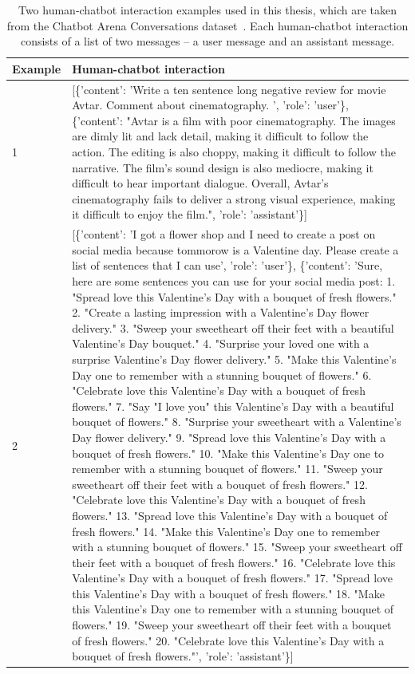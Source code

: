 \documentclass{DESSThesis}
\begin{document}
\begin{table}
	\centering
	\caption{Two human-chatbot interaction examples used in this thesis, which are taken from the Chatbot Arena Conversations dataset~\cite{zheng_judging_2023}. Each human-chatbot interaction consists of a list of two messages -- a user message and an assistant message.}
	\label{tab:examples-interactions}
	\begin{threeparttable}
		\renewcommand*{\arraystretch}{1.3}
		\setlength{\tabcolsep}{0.7em}
		\begin{tabularx}{\textwidth}{lX}
			\toprule
			Example &  Human-chatbot interaction \\
			\midrule
			1&[\{'content': 'Write a ten sentence long negative review for movie Avtar. Comment about cinematography. ',
				'role': 'user'\},
			\{'content': "Avtar is a film with poor cinematography. The images are dimly lit and lack detail, making it difficult to follow the action. The editing is also choppy, making it difficult to follow the narrative. The film's sound design is also mediocre, making it difficult to hear important dialogue. Overall, Avtar's cinematography fails to deliver a strong visual experience, making it difficult to enjoy the film.",
				'role': 'assistant'\}]\\
			2&[\{'content': 'I got a flower shop and I need to create a post on social media because tommorow is a Valentine day. Please create a list of sentences that I can use',
				'role': 'user'\},
			\{'content': 'Sure, here are some sentences you can use for your social media post: 1.   "Spread love this Valentine's Day with a bouquet of fresh flowers." 2.   "Create a lasting impression with a Valentine's Day flower delivery." 3.   "Sweep your sweetheart off their feet with a beautiful Valentine's Day bouquet." 4.   "Surprise your loved one with a surprise Valentine's Day flower delivery." 5.   "Make this Valentine's Day one to remember with a stunning bouquet of flowers." 6.   "Celebrate love this Valentine's Day with a bouquet of fresh flowers." 7.   "Say "I love you" this Valentine's Day with a beautiful bouquet of flowers." 8.   "Surprise your sweetheart with a Valentine's Day flower delivery." 9.   "Spread love this Valentine's Day with a bouquet of fresh flowers." 10.   "Make this Valentine's Day one to remember with a stunning bouquet of flowers." 11.   "Sweep your sweetheart off their feet with a bouquet of fresh flowers." 12.   "Celebrate love this Valentine's Day with a bouquet of fresh flowers." 13.   "Spread love this Valentine's Day with a bouquet of fresh flowers." 14.   "Make this Valentine's Day one to remember with a stunning bouquet of flowers." 15.   "Sweep your sweetheart off their feet with a bouquet of fresh flowers." 16.   "Celebrate love this Valentine's Day with a bouquet of fresh flowers." 17.   "Spread love this Valentine's Day with a bouquet of fresh flowers." 18.   "Make this Valentine's Day one to remember with a stunning bouquet of flowers." 19.   "Sweep your sweetheart off their feet with a bouquet of fresh flowers." 20.   "Celebrate love this Valentine's Day with a bouquet of fresh flowers."',
				'role': 'assistant'\}]\\
			

\end{tabularx}
\end{threeparttable}
\end{table}
\end{document}
